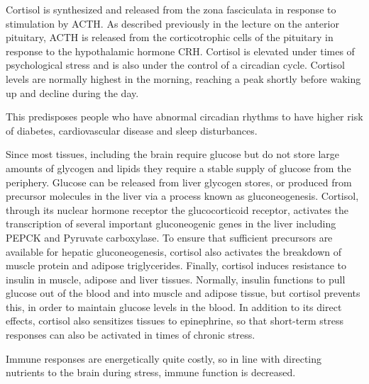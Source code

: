 \documentclass{tufte-handout}
\begin{document}
Cortisol is synthesized and released from the zona fasciculata in response to stimulation by ACTH.  As described previously in the lecture on the anterior pituitary, ACTH is released from the corticotrophic cells of the pituitary in response to the hypothalamic hormone CRH.  Cortisol is elevated under times of psychological stress and is also under the control of a circadian cycle.  Cortisol levels are normally highest in the morning, reaching a peak shortly before waking up and decline during the day.

  This predisposes people who have abnormal circadian rhythms to have higher risk of diabetes, cardiovascular disease and sleep disturbances\cite{Scheer2009,Pan2011}.

  Since most tissues, including the brain require glucose but do not store large amounts of glycogen and lipids they require a stable supply of glucose from the periphery.  Glucose can be released from liver glycogen stores, or produced from precursor molecules in the liver via a process known as gluconeogenesis.  Cortisol, through its nuclear hormone receptor the glucocorticoid receptor, activates the transcription of several important gluconeogenic genes in the liver including PEPCK and Pyruvate carboxylase.  To ensure that sufficient precursors are available for hepatic gluconeogenesis, cortisol also activates the breakdown of muscle protein and adipose triglycerides.  Finally, cortisol induces resistance to insulin in muscle, adipose and liver tissues.  Normally, insulin functions to pull glucose out of the blood and into muscle and adipose tissue, but cortisol prevents this, in order to maintain glucose levels in the blood.  In addition to its direct effects, cortisol also sensitizes tissues to epinephrine, so that short-term stress responses can also be activated in times of chronic stress.

  Immune responses are energetically quite costly, so in line with directing nutrients to the brain during stress, immune function is decreased.
\end{document}
